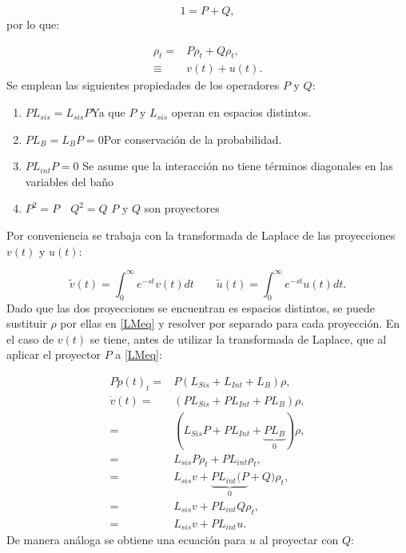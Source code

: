 \documentclass[a4paper,10pt]{report}
\begin{document}
\begin{equation}
1 = P + Q,
\end{equation} por lo que:

\begin{align}
\rho_t =& P\rho_t + Q\rho_t ,\\
\equiv & v(t)+u(t).
\end{align} Se emplean las siguientes propiedades de los operadores $P$ y $Q$:

\begin{enumerate}
\item $ PL_{sis} = L_{sis}P$\qquad Ya que $ P $ y $ L_{sis} $ operan en espacios distintos.

\item $ PL_{B} = L_{B}P = 0 $\qquad Por conservación de la probabilidad.

\item $PL_{int}P=0$ \qquad Se asume que la interacción no tiene términos diagonales en las variables del baño

\item $P^2 = P \quad Q^2 = Q$ \qquad $P$ y $Q$ son proyectores
\end{enumerate}

Por conveniencia se trabaja con la transformada de Laplace \cite{ArfkenMM} de las proyecciones $v(t)$ y $u(t)$:

\begin{equation}
\tilde{v}(t) = \int_0^\infty e^{-st}v(t)dt \qquad \tilde{u}(t) = \int_0^\infty e^{-st}u(t)dt.
\end{equation} Dado que las dos proyecciones se encuentran es espacios distintos, se puede sustituir $\rho$ por ellas en \eqref{LMeq} y resolver por separado para cada proyección. En el caso de $v(t)$ se tiene, antes de utilizar la transformada de Laplace, que al aplicar el proyector $P$ a \eqref{LMeq}:

\begin{align*}
P\dot{p}(t)_t =& P(L_{Sis}+L_{Int}+L_B)\rho, \\
 \dot{v}(t) =& (PL_{Sis}+PL_{Int}+PL_B)\rho, \\
 =&(L_{Sis}P+PL_{Int}+\underbrace{PL_B}_0)\rho, \\
 =& L_{sis}P\rho_t + PL_{int}\rho_t, \\
 =& L_{sis}v + \underbrace{PL_{int}(P}_0+Q)\rho_t, \\
 =& L_{sis}v + PL_{int}Q\rho_t, \\
 =& L_{sis}v + PL_{int}u.
\end{align*} De manera análoga se obtiene una ecuación para $u$ al proyectar con $Q$:
\end{document}
